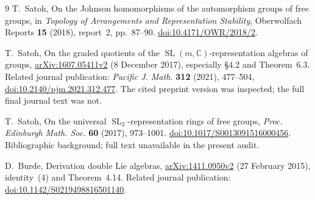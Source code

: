 \documentclass[11pt,letterpaper]{article}
\newcommand{\SL}{\operatorname{SL}}
\newcommand{\C}{\mathbb{C}}
\begin{document}
\begin{thebibliography}{9}
T.~Satoh, On the Johnson homomorphisms of the automorphism groups of free
groups, in \emph{Topology of Arrangements and Representation Stability},
Oberwolfach Reports \textbf{15} (2018), report~2, pp.~87--90.
\href{https://doi.org/10.4171/OWR/2018/2}{doi:10.4171/OWR/2018/2}.

T.~Satoh, On the graded quotients of the $\SL(m,\C)$-representation
algebras of groups, \href{https://arxiv.org/abs/1607.05411v2}{arXiv:1607.05411v2}
(8 December 2017), especially \S4.2 and Theorem~6.3.
Related journal publication: \emph{Pacific J. Math.} \textbf{312} (2021),
477--504, \href{https://doi.org/10.2140/pjm.2021.312.477}{doi:10.2140/pjm.2021.312.477}.
The cited preprint version was inspected; the full final journal text was not.

T.~Satoh, On the universal $\SL_2$-representation rings of free groups,
\emph{Proc. Edinburgh Math. Soc.} \textbf{60} (2017), 973--1001.
\href{https://doi.org/10.1017/S0013091516000456}{doi:10.1017/S0013091516000456}.
Bibliographic background; full text unavailable in the present audit.

D.~Burde, Derivation double Lie algebras,
\href{https://arxiv.org/abs/1411.0950v2}{arXiv:1411.0950v2}
(27 February 2015), identity~(4) and Theorem~4.14.
Related journal publication:
\href{https://doi.org/10.1142/S0219498816501140}{doi:10.1142/S0219498816501140}.
\end{thebibliography}
\end{document}
